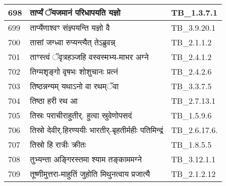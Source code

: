 \documentclass[17pt]{extarticle}
\begin{document}
\begin{longtable}{||p{0.4in}||p{4.9in}||p{0.9in}||}
    698 & तार्प्यं ॅयजमानं परिधापयति यज्ञो & TB\_1.3.7.1       \\
    
    \hline
        
    699 & तार्प्येणाश्वꣳ संज्ञ्पयन्ति यज्ञो वै & TB\_3.9.20.1       \\
    
    \hline
        
    700 & तासां जग्ध्वा रुप्यन्त्यैत् तेऽब्रुवन्न् & TB\_2.1.1.2       \\
    
    \hline
        
    701 & ताꣳस्त्वं ॅवृत्रहञ्जहि वस्वस्मभ्य{-}माभर अग्ने & TB\_2.4.1.2       \\
    
    \hline
        
    702 & तिग्मशृङ्गो वृषभः शोशुचानः प्रत्नं & TB\_2.4.2.6       \\
    
    \hline
        
    703 & तिष्ठन्नन्यम् यथाऽनो वा रथम्ॅवा & TB\_3.3.7.5       \\
    
    \hline
        
    704 & तिष्ठा हरी रथ आ & TB\_2.7.13.1       \\
    
    \hline
        
    705 & तिस्रः पराचीराहुतीर्. हुत्वा स्रुवेणोपसदं & TB\_1.5.9.6       \\
    
    \hline
        
    706 & तिस्रो देवीर्.हिरण्ययीः भारतीर्{-}बृहतीर्महीः पतिमिन्द्रं & TB\_2.6.17.6.       \\
    
    \hline
        
    707 & तिस्रो हि रात्रीः क्रीतः & TB\_1.8.5.5       \\
    
    \hline
        
    708 & तुभ्यन्ता अङ्गिरस्तमा श्याम तङ्काममग्ने & TB\_3.12.1.1       \\
    
    \hline
        
    709 & तूष्णीमुत्तरा{-}माहुतिं जुहोति मिथुनत्वाय प्रजात्यै & TB\_2.1.2.12       \\
    
    \hline
        

\end{longtable}
\end{document}
